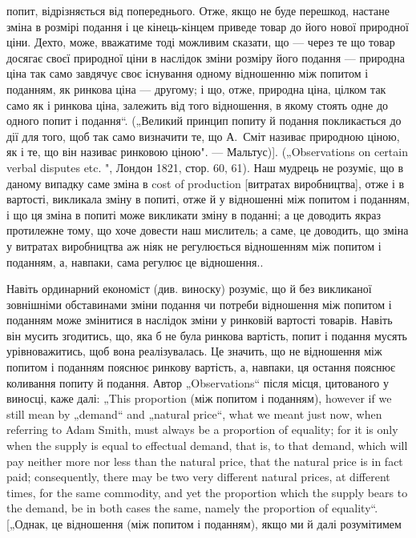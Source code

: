 {попит, відрізняється від попереднього. Отже, якщо не буде перешкод,
настане зміна в розмірі подання і це кінець-кінцем приведе товар до його
нової природної ціни. Дехто, може, вважатиме тоді можливим сказати, що —
через те що товар досягає своєї природної ціни в наслідок зміни розміру
його подання — природна ціна так само завдячує своє існування одному відношенню
між попитом і поданням, як ринкова ціна — другому; і що, отже,
природна ціна, цілком так само як і ринкова ціна, залежить від того відношення,
в якому стоять одне до одного попит і подання“. („Великий принцип
попиту й подання покликається до дії для того, щоб так само визначити
те, що А.~Сміт називає природною ціною, як і те, що він називає ринковою
ціною". — Мальтус)]. („Observations on certain verbal disputes etc. ", Лондон 1821,
стор. 60, 61). Наш мудрець не розуміє, що в даному випадку саме зміна в cost
of production [витратах виробництва], отже і в вартості, викликала зміну в попиті,
отже й у відношенні між попитом і поданням, і що ця зміна в попиті
може викликати зміну в поданні; а це доводить якраз протилежне тому, що
хоче довести наш мислитель; а саме, це доводить, що зміна у витратах виробництва
аж ніяк не регулюється відношенням між попитом і поданням, а, навпаки,
сама регулює це відношення.}.

Навіть ординарний економіст (див. виноску) розуміє, що
й без викликаної зовнішніми обставинами зміни подання чи потреби
відношення між попитом і поданням може змінитися
в наслідок зміни у ринковій вартості товарів. Навіть він мусить
згодитись, що, яка б не була ринкова вартість, попит і подання
мусять урівноважитись, щоб вона реалізувалась. Це значить,
що не відношення між попитом і поданням пояснює ринкову
вартість, а, навпаки, ця остання пояснює коливання попиту
й подання. Автор „Observations“ після місця, цитованого у виносці,
каже далі: „This proportion (між попитом і поданням),
however if we still mean by „demand“ and „natural price“, what
we meant just now, when referring to Adam Smith, must always
be a proportion of equality; for it is only when the supply is equal
to effectual demand, that is, to that demand, which will pay neither
more nor less than the natural price, that the natural price is in
fact paid; consequently, there may be two very different natural
prices, at different times, for the same commodity, and yet the
proportion which the supply bears to the demand, be in both cases
the same, namely the proportion of equality“. [„Однак, це відношення
(між попитом і поданням), якщо ми й далі розумітимем
\parbreak{}  %
